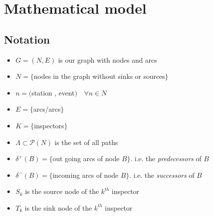 \documentclass[11pt]{article}
\begin{document}
\section{Mathematical model}

\subsection{Notation}
\begin{itemize}\itemsep -2pt
    \item $G = (N,E)$ is our graph with nodes and arcs
    \item $N = \{$nodes in the graph without sinks or sources$\}$
    \item $n = ($station , event$)\quad \forall n\in N$
    \item $E = \{$arcs/arcs$\}$
    \item $K = \{$inspectors$\}$
    \item $\Lambda\subset\mathcal{P}(N)$ is the set of all paths
    \item $\delta^+(B) = \{$out going arcs of node $B\}$. i.e. the \textit{predecessors} of $B$
    \item $\delta^-(B) = \{$incoming arcs of node $B\}$. i.e. the \textit{successors} of $B$
    \item $S_k$ is the source node of the $k^{th}$ inspector
    \item $T_k$ is the sink node of the $k^{th}$ inspector
\end{itemize}


\end{document}
